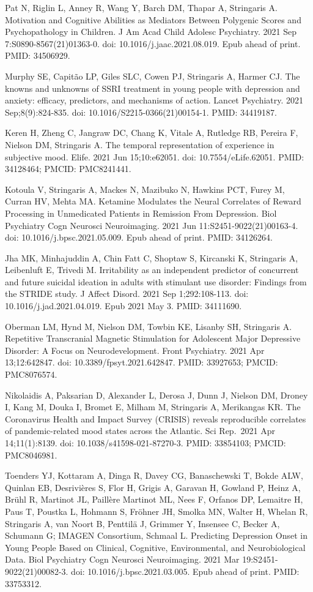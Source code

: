\documentclass[
]{article}
\begin{document}
Pat N, Riglin L, Anney R, Wang Y, Barch DM, Thapar A, Stringaris A.
Motivation and Cognitive Abilities as Mediators Between Polygenic Scores
and Psychopathology in Children. J Am Acad Child Adolesc Psychiatry.
2021 Sep 7:S0890-8567(21)01363-0. doi: 10.1016/j.jaac.2021.08.019. Epub
ahead of print. PMID: 34506929.

Murphy SE, Capitão LP, Giles SLC, Cowen PJ, Stringaris A, Harmer CJ. The
knowns and unknowns of SSRI treatment in young people with depression
and anxiety: efficacy, predictors, and mechanisms of action. Lancet
Psychiatry. 2021 Sep;8(9):824-835. doi: 10.1016/S2215-0366(21)00154-1.
PMID: 34419187.

Keren H, Zheng C, Jangraw DC, Chang K, Vitale A, Rutledge RB, Pereira F,
Nielson DM, Stringaris A. The temporal representation of experience in
subjective mood. Elife. 2021 Jun 15;10:e62051. doi: 10.7554/eLife.62051.
PMID: 34128464; PMCID: PMC8241441.

Kotoula V, Stringaris A, Mackes N, Mazibuko N, Hawkins PCT, Furey M,
Curran HV, Mehta MA. Ketamine Modulates the Neural Correlates of Reward
Processing in Unmedicated Patients in Remission From Depression. Biol
Psychiatry Cogn Neurosci Neuroimaging. 2021 Jun
11:S2451-9022(21)00163-4. doi: 10.1016/j.bpsc.2021.05.009. Epub ahead of
print. PMID: 34126264.

Jha MK, Minhajuddin A, Chin Fatt C, Shoptaw S, Kircanski K, Stringaris
A, Leibenluft E, Trivedi M. Irritability as an independent predictor of
concurrent and future suicidal ideation in adults with stimulant use
disorder: Findings from the STRIDE study. J Affect Disord. 2021 Sep
1;292:108-113. doi: 10.1016/j.jad.2021.04.019. Epub 2021 May 3. PMID:
34111690.

Oberman LM, Hynd M, Nielson DM, Towbin KE, Lisanby SH, Stringaris A.
Repetitive Transcranial Magnetic Stimulation for Adolescent Major
Depressive Disorder: A Focus on Neurodevelopment. Front Psychiatry. 2021
Apr 13;12:642847. doi: 10.3389/fpsyt.2021.642847. PMID: 33927653; PMCID:
PMC8076574.

Nikolaidis A, Paksarian D, Alexander L, Derosa J, Dunn J, Nielson DM,
Droney I, Kang M, Douka I, Bromet E, Milham M, Stringaris A, Merikangas
KR. The Coronavirus Health and Impact Survey (CRISIS) reveals
reproducible correlates of pandemic-related mood states across the
Atlantic. Sci Rep.~2021 Apr 14;11(1):8139. doi:
10.1038/s41598-021-87270-3. PMID: 33854103; PMCID: PMC8046981.

Toenders YJ, Kottaram A, Dinga R, Davey CG, Banaschewski T, Bokde ALW,
Quinlan EB, Desrivières S, Flor H, Grigis A, Garavan H, Gowland P, Heinz
A, Brühl R, Martinot JL, Paillère Martinot ML, Nees F, Orfanos DP,
Lemaitre H, Paus T, Poustka L, Hohmann S, Fröhner JH, Smolka MN, Walter
H, Whelan R, Stringaris A, van Noort B, Penttilä J, Grimmer Y, Insensee
C, Becker A, Schumann G; IMAGEN Consortium, Schmaal L. Predicting
Depression Onset in Young People Based on Clinical, Cognitive,
Environmental, and Neurobiological Data. Biol Psychiatry Cogn Neurosci
Neuroimaging. 2021 Mar 19:S2451-9022(21)00082-3. doi:
10.1016/j.bpsc.2021.03.005. Epub ahead of print. PMID: 33753312.
\end{document}
